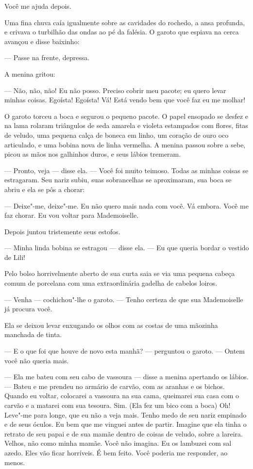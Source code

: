 Você me ajuda depois.

Uma fina chuva caía igualmente sobre as cavidades do rochedo, a ansa
profunda, e crivava o turbilhão das ondas ao pé da falésia. O garoto que
espiava na cerca avançou e disse baixinho:

--- Passe na frente, depressa.

A menina gritou:

--- Não, não, não! Eu não posso. Preciso cobrir meu pacote; eu quero
levar minhas coisas. Egoísta! Egoísta! Vá! Está vendo bem que você faz
eu me molhar!

O garoto torceu a boca e segurou o pequeno pacote. O papel ensopado se
desfez e na lama rolaram triângulos de seda amarela e violeta estampados
com flores, fitas de veludo, uma pequena calça de boneca em linho, um
coração de ouro oco articulado, e uma bobina nova de linha vermelha. A
menina passou sobre a sebe, picou as mãos nos galhinhos duros, e seus
lábios tremeram.

--- Pronto, veja --- disse ela. --- Você foi muito teimoso. Todas as minhas
coisas se estragaram. Seu nariz subiu, suas sobrancelhas se aproximaram,
sua boca se abriu e ela se pôs a chorar:

--- Deixe"-me, deixe"-me. Eu não quero mais nada com você. Vá embora. Você
me faz chorar. Eu vou voltar para Mademoiselle.

Depois juntou tristemente seus estofos.

--- Minha linda bobina se estragou --- disse ela. --- Eu que queria bordar o
vestido de Lili!

Pelo bolso horrivelmente aberto de sua curta saia se via uma pequena
cabeça comum de porcelana com uma extraordinária gadelha de cabelos
loiros.

--- Venha --- cochichou"-lhe o garoto. --- Tenho certeza de que sua Mademoiselle
já procura você.

Ela se deixou levar enxugando os olhos com as costas de uma mãozinha
manchada de tinta.

--- E o que foi que houve de novo esta manhã? --- perguntou o garoto. --- Ontem
você não queria mais.

--- Ela me bateu com seu cabo de vassoura --- disse a menina apertando os
lábios. --- Bateu e me prendeu no armário de carvão, com as aranhas e os bichos.
Quando eu voltar, colocarei a vassoura na sua cama, queimarei sua casa com
o carvão e a matarei com sua tesoura. Sim. (Ela fez um bico com a boca)
Oh! Leve"-me para longe, que eu não a veja mais. Tenho medo de seu nariz
empinado e de seus óculos. Eu bem que me vinguei antes de partir. Imagine que
ela tinha o retrato de seu papai e de sua mamãe dentro de coisas de
veludo, sobre a lareira. Velhos, não como minha mamãe. Você não imagina.
Eu os lambuzei com sal azedo. Eles vão ficar horríveis. É bem
feito. Você poderia me responder, ao menos.

